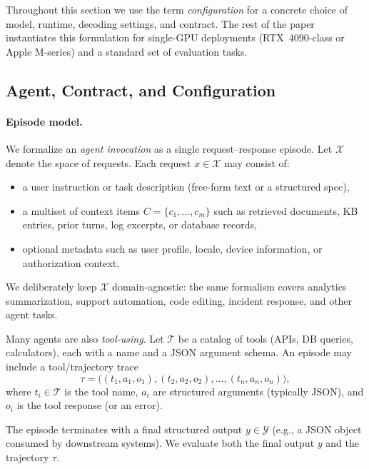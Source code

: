 \documentclass[11pt]{article}
\begin{document}
Throughout this section we use the term \emph{configuration} for a concrete choice of model, runtime, decoding settings, and contract.
The rest of the paper instantiates this formulation for single-GPU deployments (RTX~4090-class or Apple M-series) and a standard set of evaluation tasks.

\subsection{Agent, Contract, and Configuration}
\label{sec:problem-agent}

\paragraph{Episode model.}
We formalize an \emph{agent invocation} as a single request--response episode.
Let $\mathcal{X}$ denote the space of requests.
Each request $x \in \mathcal{X}$ may consist of:
\begin{itemize}[leftmargin=12pt]
    \item a user instruction or task description (free-form text or a structured spec),
    \item a multiset of context items $C=\{c_1,\dots,c_m\}$ such as retrieved documents, KB entries, prior turns, log excerpts, or database records,
    \item optional metadata such as user profile, locale, device information, or authorization context.
\end{itemize}
We deliberately keep $\mathcal{X}$ domain-agnostic: the same formalism covers analytics summarization, support automation, code editing, incident response, and other agent tasks.

Many agents are also \emph{tool-using}.
Let $\mathcal{T}$ be a catalog of tools (APIs, DB queries, calculators), each with a name and a JSON argument schema.
An episode may include a tool/trajectory trace
\[
\tau = \bigl((t_1,a_1,o_1), (t_2,a_2,o_2), \dots, (t_n,a_n,o_n)\bigr),
\]
where $t_i \in \mathcal{T}$ is the tool name, $a_i$ are structured arguments (typically JSON), and $o_i$ is the tool response (or an error).

The episode terminates with a final structured output $y \in \mathcal{Y}$ (e.g., a JSON object consumed by downstream systems).
We evaluate both the final output $y$ and the trajectory $\tau$.
\end{document}
